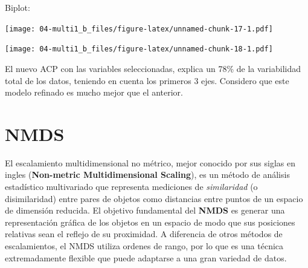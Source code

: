 \documentclass[
]{book}
\newenvironment{Shaded}{\begin{snugshade}}{\end{snugshade}}
\newcommand{\AttributeTok}[1]{\textcolor[rgb]{0.77,0.63,0.00}{#1}}
\newcommand{\ConstantTok}[1]{\textcolor[rgb]{0.00,0.00,0.00}{#1}}
\newcommand{\DecValTok}[1]{\textcolor[rgb]{0.00,0.00,0.81}{#1}}
\newcommand{\FunctionTok}[1]{\textcolor[rgb]{0.00,0.00,0.00}{#1}}
\newcommand{\NormalTok}[1]{#1}
\newcommand{\SpecialCharTok}[1]{\textcolor[rgb]{0.00,0.00,0.00}{#1}}
\newcommand{\StringTok}[1]{\textcolor[rgb]{0.31,0.60,0.02}{#1}}
\begin{document}
Biplot:

\begin{Shaded}
\end{Shaded}

\texttt{[image: 04-multi1\_b\_files/figure-latex/unnamed-chunk-17-1.pdf]}

\begin{Shaded}
\end{Shaded}

\texttt{[image: 04-multi1\_b\_files/figure-latex/unnamed-chunk-18-1.pdf]}

El nuevo ACP con las variables seleccionadas, explica un 78\% de la variabilidad total de los datos, teniendo en cuenta los primeros 3 ejes. Considero que este modelo refinado es mucho mejor que el anterior.

\hypertarget{nmds}{%
\section{NMDS}\label{nmds}}

El escalamiento multidimensional no métrico, mejor conocido por sus siglas en ingles (\textbf{Non-metric Multidimensional Scaling}), es un método de análisis estadístico multivariado que representa mediciones de \emph{similaridad} (o disimilaridad) entre pares de objetos como distancias entre puntos de un espacio de dimensión reducida. El objetivo fundamental del \textbf{NMDS} es generar una representación gráfica de los objetos en un espacio de modo que sus posiciones relativas sean el reflejo de su proximidad. A diferencia de otros métodos de escalamientos, el NMDS utiliza ordenes de rango, por lo que es una técnica extremadamente flexible que puede adaptarse a una gran variedad de datos.
\end{document}
